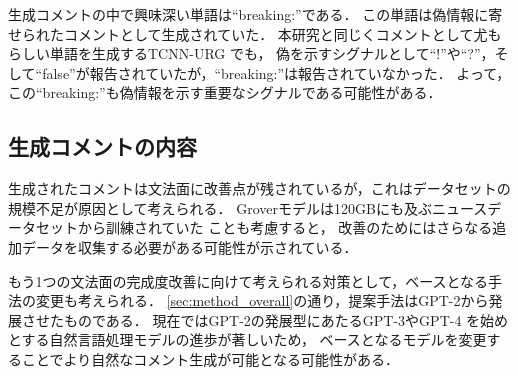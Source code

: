 生成コメントの中で興味深い単語は``breaking:''である．
この単語は偽情報に寄せられたコメントとして生成されていた．
本研究と同じくコメントとして尤もらしい単語を生成するTCNN-URG \cite{ijcai2018-533}でも，
偽を示すシグナルとして``!''や``?''，そして``false''が報告されていたが，``breaking:''は報告されていなかった．
よって，この``breaking:''も偽情報を示す重要なシグナルである可能性がある．

\subsection{生成コメントの内容}
生成されたコメントは文法面に改善点が残されているが，これはデータセットの規模不足が原因として考えられる．
Groverモデルは120GBにも及ぶニュースデータセットから訓練されていた \cite{DBLP:journals/corr/abs-1905-12616}ことも考慮すると，
改善のためにはさらなる追加データを収集する必要がある可能性が示されている．

もう1つの文法面の完成度改善に向けて考えられる対策として，ベースとなる手法の変更も考えられる．
\cref{sec:method_overall}の通り，提案手法はGPT-2から発展させたものである．
現在ではGPT-2の発展型にあたるGPT-3\cite{brown2020language}やGPT-4 \cite{openai2023gpt4}を始めとする自然言語処理モデルの進歩が著しいため，
ベースとなるモデルを変更することでより自然なコメント生成が可能となる可能性がある．
